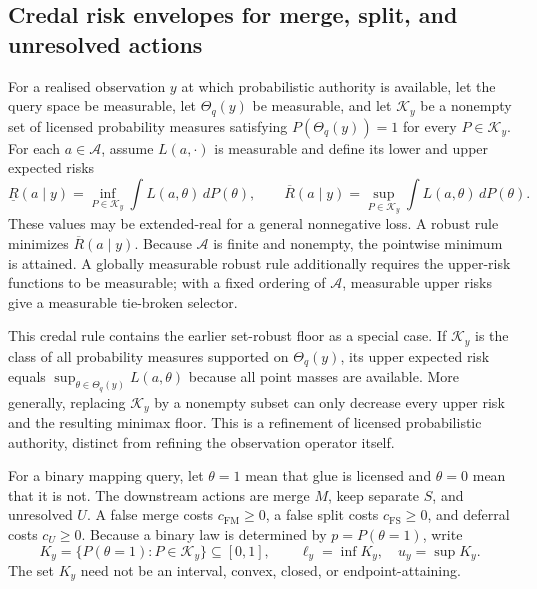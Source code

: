 \subsection{Credal risk envelopes for merge, split, and unresolved actions}

For a realised observation $y$ at which probabilistic authority is available,
let the query space be measurable, let $\Theta_q(y)$ be measurable, and let
$\mathcal K_y$ be a nonempty set of licensed probability measures satisfying
$P(\Theta_q(y))=1$ for every $P\in\mathcal K_y$. For each
$a\in\mathcal A$, assume $L(a,\cdot)$ is measurable and define its lower and
upper expected risks
\begin{equation}
 \underline R(a\mid y)=
 \inf_{P\in\mathcal K_y}\int L(a,\theta)\,dP(\theta),
 \qquad
 \overline R(a\mid y)=
 \sup_{P\in\mathcal K_y}\int L(a,\theta)\,dP(\theta).
 \label{eq:credal-risk-envelope}
\end{equation}
These values may be extended-real for a general nonnegative loss. A robust
rule minimizes $\overline R(a\mid y)$. Because $\mathcal A$ is finite and
nonempty, the pointwise minimum is attained. A globally measurable robust
rule additionally requires the upper-risk functions to be measurable; with a
fixed ordering of $\mathcal A$, measurable upper risks give a measurable
tie-broken selector.

This credal rule contains the earlier set-robust floor as a special case. If
$\mathcal K_y$ is the class of all probability measures supported on
$\Theta_q(y)$, its upper expected risk equals
$\sup_{\theta\in\Theta_q(y)}L(a,\theta)$ because all point masses are
available. More generally, replacing $\mathcal K_y$ by a nonempty subset can
only decrease every upper risk and the resulting minimax floor. This is a
refinement of licensed probabilistic authority, distinct from refining the
observation operator itself.

For a binary mapping query, let $\theta=1$ mean that glue is licensed and
$\theta=0$ mean that it is not. The downstream actions are merge $M$, keep
separate $S$, and unresolved $U$. A false merge costs $c_{\mathrm{FM}}\geq0$, a
false split costs $c_{\mathrm{FS}}\geq0$, and deferral costs $c_U\geq0$. Because
a binary law is determined by $p=P(\theta=1)$, write
\begin{equation}
 K_y=\{P(\theta=1):P\in\mathcal K_y\}\subseteq[0,1],
 \qquad \ell_y=\inf K_y,\quad u_y=\sup K_y.
 \label{eq:binary-credal-set}
\end{equation}
The set $K_y$ need not be an interval, convex, closed, or endpoint-attaining.


